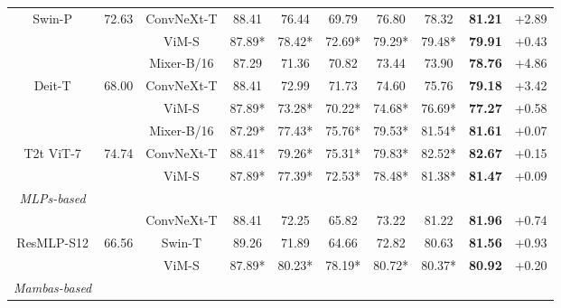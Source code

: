 \begin{table*}[t]
{\begin{tabular}{@{}cccccccccc@{}}
Swin-P               & 72.63        & ConvNeXt-T    & 88.41        & 76.44 & 69.79 & 76.80 & 78.32  & \textbf{81.21}  & {\color[HTML]{FF0000} +2.89} \\
                     &              & ViM-S         & 87.89*       & 78.42*     &  72.69*      & 79.29*    & 79.48* & \textbf{79.91}  & {\color[HTML]{FF0000} +0.43} \\ \midrule
                     &              & Mixer-B/16    & 87.29        & 71.36 & 70.82 & 73.44 & 73.90  & \textbf{78.76}  & {\color[HTML]{FF0000} +4.86} \\
Deit-T               & 68.00        & ConvNeXt-T    & 88.41        & 72.99 & 71.73 & 74.60 & 75.76  & \textbf{79.18}  & {\color[HTML]{FF0000} +3.42} \\
                     &              & ViM-S         & 87.89*       & 73.28*     & 70.22*     & 74.68*     & 76.69* & \textbf{77.27}  & {\color[HTML]{FF0000} +0.58} \\ \midrule
                     &              & Mixer-B/16    & 87.29*       & 77.43*     & 75.76*     & 79.53*     & 81.54* & \textbf{81.61}  & {\color[HTML]{FF0000} +0.07} \\
T2t ViT-7            & 74.74        & ConvNeXt-T    & 88.41*       & 79.26*     & 75.31*     &  79.83*     & 82.52* & \textbf{82.67}  & {\color[HTML]{FF0000} +0.15} \\
                     &              & ViM-S         & 87.89*       & 77.39*     & 72.53*     & 78.48*     & 81.38* & \textbf{81.47}  & {\color[HTML]{FF0000} +0.09} \\ \midrule
\textit{MLPs-based}   &              &               &              &       &       &       &        &                 & {\color[HTML]{FF0000} }      \\ \midrule
                     &              & ConvNeXt-T    & 88.41        & 72.25 & 65.82 & 73.22 & 81.22  & \textbf{81.96}  & {\color[HTML]{FF0000} +0.74} \\
ResMLP-S12           & 66.56        & Swin-T        & 89.26        & 71.89 & 64.66 & 72.82 & 80.63  & \textbf{81.56}  & {\color[HTML]{FF0000} +0.93} \\
                     &              & ViM-S         & 87.89*       & 80.23*     & 78.19*     & 80.72*     & 80.37* & \textbf{80.92}  & {\color[HTML]{FF0000} +0.20} \\ \midrule
\textit{Mambas-based} &              &               &              &       &       &       &        &                 & {\color[HTML]{FF0000} }      \\ \midrule

\end{tabular}}
\end{table*}

